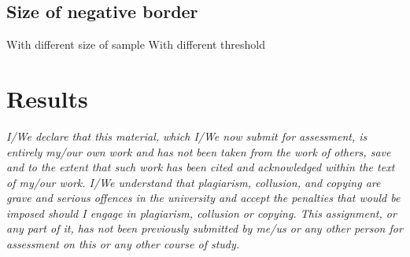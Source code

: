 \documentclass[14pt]{extarticle}
\begin{document}
\subsection{Size of negative border}
With different size of sample
With different threshold
\section{Results}
{\it I/We declare that this material, which I/We now submit for assessment, is entirely my/our own work and has not been taken from the work of others, save and to the extent that such work has been cited and acknowledged within the text of my/our work. I/We understand that plagiarism, collusion, and copying are grave and serious offences in the university and accept the penalties that would be imposed should I engage in plagiarism, collusion or copying. This assignment, or any part of it, has not been previously submitted by me/us or any other person for assessment on this or any other course of study.}

\begin{comment}
The report should contain the following information:

-the chosen dataset, and the parts of the latter which have been considered,
-how data have been organized,
-the applied pre-processing techniques,
-the considered algorithms and their implementations,
-how the proposed solution scales up with data size,
-a description of the experiments,
-comments and discussion on the experimental results.

\end{comment}
\end{document}
